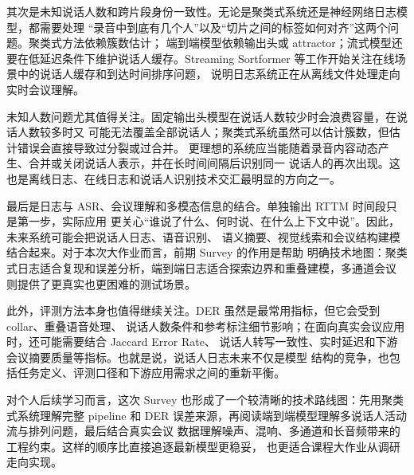 \documentclass[UTF8,a4paper,10pt]{ctexart}
\begin{document}
其次是未知说话人数和跨片段身份一致性。无论是聚类式系统还是神经网络日志模型，都需要处理
“录音中到底有几个人”以及“切片之间的标签如何对齐”这两个问题。聚类式方法依赖簇数估计；
端到端模型依赖输出头或 attractor；流式模型还要在低延迟条件下维护说话人缓存。Streaming
Sortformer 等工作开始关注在线场景中的说话人缓存和到达时间排序问题\cite{medennikov2025streaming}，
说明日志系统正在从离线文件处理走向实时会议理解。

未知人数问题尤其值得关注。固定输出头模型在说话人数较少时会浪费容量，在说话人数较多时又
可能无法覆盖全部说话人；聚类式系统虽然可以估计簇数，但估计错误会直接导致过分裂或过合并。
更理想的系统应当能随着录音内容动态产生、合并或关闭说话人表示，并在长时间间隔后识别同一
说话人的再次出现。这也是离线日志、在线日志和说话人识别技术交汇最明显的方向之一。

最后是日志与 ASR、会议理解和多模态信息的结合。单独输出 RTTM 时间段只是第一步，实际应用
更关心“谁说了什么、何时说、在什么上下文中说”。因此，未来系统可能会把说话人日志、语音识别、
语义摘要、视觉线索和会议结构建模结合起来。对于本次大作业而言，前期 Survey 的作用是帮助
明确技术地图：聚类式日志适合复现和误差分析，端到端日志适合探索边界和重叠建模，多通道会议
则提供了更真实也更困难的测试场景。

此外，评测方法本身也值得继续关注。DER 虽然是最常用指标，但它会受到 collar、重叠语音处理、
说话人数条件和参考标注细节影响；在面向真实会议应用时，还可能需要结合 Jaccard Error Rate、
说话人转写一致性、实时延迟和下游会议摘要质量等指标。也就是说，说话人日志未来不仅是模型
结构的竞争，也包括任务定义、评测口径和下游应用需求之间的重新平衡。

对个人后续学习而言，这次 Survey 也形成了一个较清晰的技术路线图：先用聚类式系统理解完整
pipeline 和 DER 误差来源，再阅读端到端模型理解多说话人活动流与排列问题，最后结合真实会议
数据理解噪声、混响、多通道和长音频带来的工程约束。这样的顺序比直接追逐最新模型更稳妥，
也更适合课程大作业从调研走向实现。
\end{document}
